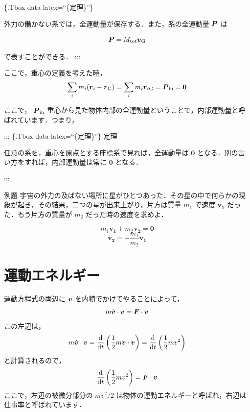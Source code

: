 \documentclass[
  b4paperpaper,
  xelatex,ja=standard]{bxjsbook}
\begin{document}
\{.Tbox data-latex=``\{定理\}''\}

外力の働かない系では，全運動量が保存する．また，系の全運動量 \(\vb*{P}\)
は

\[\vb*{P}=M_{\text{tot}}\boldsymbol{v}_{\text{G}} \]

で表すことができる． :::

ここで，重心の定義を考えた時， \begin{align*}
\sum_i m_i (\boldsymbol{r}_i-\boldsymbol{r}_\text{G})=\sum_i m_i \boldsymbol{r}_{i\text{G}}=\vb*{P}_{\text{in}}=\boldsymbol{0}
\end{align*}

ここで， \(\vb*{P}_{\text{in}}\)
重心から見た物体内部の全運動量ということで，内部運動量と呼ばれています．つまり，

::: \{.Tbox data-latex=``\{定理\}''\} 定理

任意の系を，重心を原点とする座標系で見れば，全運動量は
\(\boldsymbol{0}\) となる．別の言い方をすれば，内部運動量は常に
\(\boldsymbol{0}\) となる．

:::

\begin{Rbox}{例題}
宇宙の外力の及ばない場所に星がひとつあった．その星の中で何らかの現象が起き，その結果，二つの星が出来上がり，片方は質量
\(m_1\) で速度 \(\boldsymbol{v_1}\) だった．もう片方の質量が \(m_2\)
だった時の速度を求めよ．

\end{Rbox}


\[m_1\boldsymbol{v_1}+m_2\boldsymbol{v_2}=\boldsymbol{0}\]
\[\boldsymbol{v_2}=-\frac{m_1}{m_2}\boldsymbol{v_1}\]

\hypertarget{ux904bux52d5ux30a8ux30cdux30ebux30aeux30fc}{%
\section{運動エネルギー}\label{ux904bux52d5ux30a8ux30cdux30ebux30aeux30fc}}

運動方程式の両辺に \(\vb*{v}\) を内積でかけてやることによって，
\[m\dot{\boldsymbol{v}}\cdot \boldsymbol{v}=\boldsymbol{F}\cdot\vb*{v}\]
この左辺は，
\[m\dot{\boldsymbol{v}}\cdot \boldsymbol{v}=\dv{t}\left(\frac{1}{2}m\boldsymbol{v}\cdot \boldsymbol{v}\right)=\dv{t}\left(\frac{1}{2}mv^2\right)\]
と計算されるので，
\[\dv{t}\left(\frac{1}{2}mv^2\right)=\boldsymbol{F}\cdot\vb*{v}\]
ここで，左辺の被微分部分の \(mv^2/2\)
は物体の運動エネルギーと呼ばれ，右辺は仕事率と呼ばれています．
\end{document}
